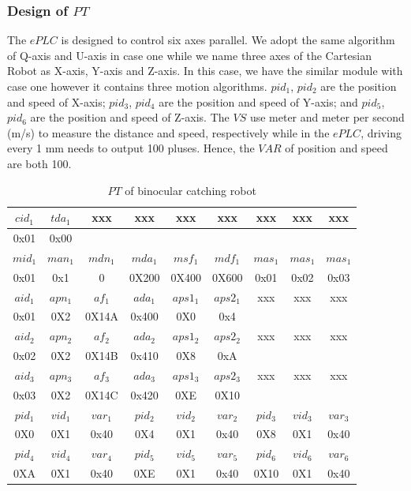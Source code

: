 \documentclass[journal,UTF8]{IEEEtran}
\begin{document}
\subsubsection{Design of $PT$}
The $ePLC$ is designed to control six axes parallel. We adopt the same algorithm of Q-axis and U-axis in case one while we name three axes of the Cartesian Robot as X-axis, Y-axis and Z-axis. In this case, we have the similar module with case one however it contains three motion algorithms. $pid_1$, $pid_2$ are the position and speed of X-axis; $pid_3$, $pid_4$ are the position and speed of Y-axis; and $pid_5$, $pid_6$ are the position and speed of Z-axis. The $VS$ use meter and meter per second (m/s) to measure the distance and speed, respectively while in the $ePLC$, driving every 1 mm needs to output 100 pluses. Hence, the $VAR$ of position and speed are both 100.    
\begin{table}
	\scriptsize \caption{$PT$ of binocular catching robot}
	\label{table:PTofRobot}
	\begin{center}
		\renewcommand{\arraystretch}{1.4}
		\setlength\tabcolsep{3pt}
		\begin{tabular}{|c|c|c|c|c|c|c|c|c|}
			\hline
			$cid_1$  & $tda_1$   &xxx &xxx& xxx  &xxx &xxx&xxx&xxx \\
			\hline
			0x01&0x00&& &&&&&\\
			\hline
			$mid_1$  &$man_1$&$mdn_1$&$mda_1$&$msf_1$&$mdf_1$&$mas_1$&$mas_1$&$mas_1$\\
			\hline
			0x01     &0x1     &   0    &0X200  &0X400  & 0X600 &0x01   &0x02   &0x03 \\
			\hline
			$aid_1$  & $apn_1$& $af_1$ &$ada_1$ &$aps1_1$  &$aps2_1$&xxx&xxx&xxx\\
			\hline
			0x01     & 0X2    & 0X14A  &0x400 &0X0   &0x4 &&&\\
			\hline
			$aid_2$  & $apn_2$& $af_2$ &$ada_2$ &$aps1_2$  &$aps2_2$&xxx&xxx&xxx\\
			\hline
			0x02     & 0X2    & 0X14B  &0x410  &0X8       &0xA &&&\\
			\hline
			$aid_3$  & $apn_3$& $af_3$ &$ada_3$ &$aps1_3$  &$aps2_3$&xxx&xxx&xxx\\
			\hline
			0x03     & 0X2    & 0X14C  &0x420   &0XE       &0X10 &&&\\
			\hline
			$pid_1$  &$vid_1$ &$var_1$ &$pid_2$ &$vid_2$&$var_2$ &$pid_3$&$vid_3$&$var_3$\\
			\hline
			0X0      & 0X1    & 0x40  &0X4     &0X1    & 0x40  &0X8      & 0X1    & 0x40\\
			\hline
			$pid_4$  &$vid_4$ &$var_4$ &$pid_5$ &$vid_5$&$var_5$ &$pid_6$  &$vid_6$ &$var_6$\\
			\hline
			0XA      & 0X1    & 0x40  &0XE     &0X1    & 0x40  &0X10     & 0X1    & 0x40\\
			\hline
		\end{tabular}
	\end{center}
\end{table}
\end{document}
